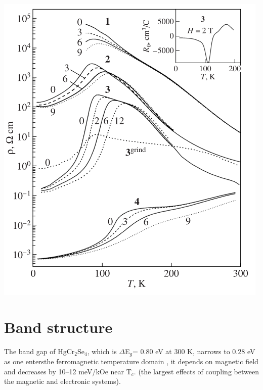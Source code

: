 \documentclass[preprint,pre,floats,aps,amsmath,amssymb]{revtex4}
\begin{document}
\begin{minipage}{.49\linewidth}
\includegraphics[height=1\linewidth]{resvstemp.png}
\centering{}
\end{minipage}


\section{Band structure}

The band gap of HgCr$_2$Se$_4$, which is $\Delta$E$_g$= 0.80 eV at 300 K, narrows to 0.28 eV as one entersthe ferromagnetic temperature domain \cite{lehmann}, it depends on magnetic field and decreases by 10–12 meV/kOe near T$_c$. (the largest effects of coupling between the magnetic and electronic systems).

\end{document}

